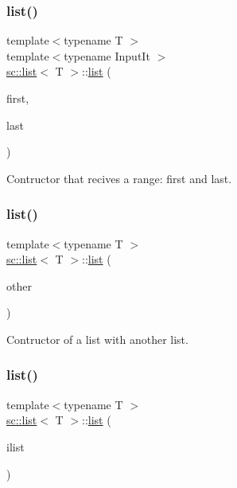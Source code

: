 \subsubsection{\texorpdfstring{list()}{list()}\hspace{0.1cm}{\footnotesize\ttfamily [3/5]}}
{\footnotesize\ttfamily template$<$typename T $>$ \\
template$<$typename Input\+It $>$ \\
\hyperlink{classsc_1_1list}{sc\+::list}$<$ T $>$\+::\hyperlink{classsc_1_1list}{list} (\begin{DoxyParamCaption}\item[{Input\+It}]{first,  }\item[{Input\+It}]{last }\end{DoxyParamCaption})\hspace{0.3cm}{\ttfamily [inline]}}



Contructor that recives a range\+: first and last. 

\mbox{\label{classsc_1_1list_a1fe5b60798e979cb0a5b1663d64ec69b}} 
\subsubsection{\texorpdfstring{list()}{list()}\hspace{0.1cm}{\footnotesize\ttfamily [4/5]}}
{\footnotesize\ttfamily template$<$typename T $>$ \\
\hyperlink{classsc_1_1list}{sc\+::list}$<$ T $>$\+::\hyperlink{classsc_1_1list}{list} (\begin{DoxyParamCaption}\item[{const \hyperlink{classsc_1_1list}{list}$<$ T $>$ \&}]{other }\end{DoxyParamCaption})\hspace{0.3cm}{\ttfamily [inline]}}



Contructor of a list with another list. 

\mbox{\label{classsc_1_1list_ae85152bcf538c929944790b1c30d3b22}} 
\subsubsection{\texorpdfstring{list()}{list()}\hspace{0.1cm}{\footnotesize\ttfamily [5/5]}}
{\footnotesize\ttfamily template$<$typename T $>$ \\
\hyperlink{classsc_1_1list}{sc\+::list}$<$ T $>$\+::\hyperlink{classsc_1_1list}{list} (\begin{DoxyParamCaption}\item[{std\+::initializer\+\_\+list$<$ T $>$}]{ilist }\end{DoxyParamCaption})\hspace{0.3cm}{\ttfamily [inline]}}



